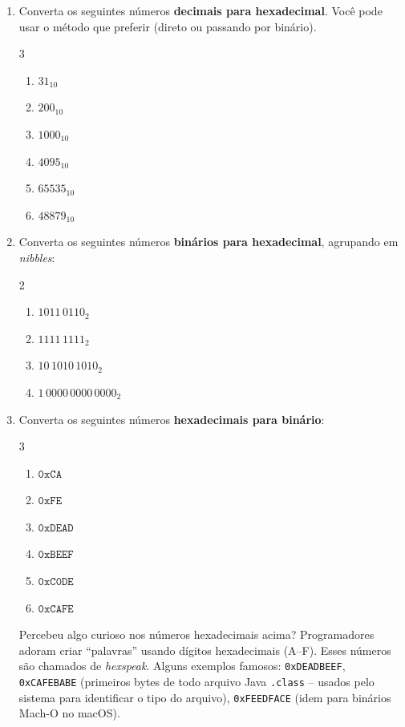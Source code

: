 \documentclass[11pt, a4paper]{article}
\begin{document}
\begin{enumerate}
\item Converta os seguintes n\'{u}meros \textbf{decimais para hexadecimal}. Voc\^{e} pode usar o m\'{e}todo que preferir (direto ou passando por bin\'{a}rio).
\begin{multicols}{3}
\begin{enumerate}
  \item $31_{10}$
  \item $200_{10}$
  \item $1000_{10}$
  \item $4095_{10}$
  \item $65535_{10}$
  \item $48879_{10}$
\end{enumerate}
\end{multicols}
\item Converta os seguintes n\'{u}meros \textbf{bin\'{a}rios para hexadecimal}, agrupando em \emph{nibbles}:
\begin{multicols}{2}
\begin{enumerate}
  \item $1011\,0110_2$
  \item $1111\,1111_2$
  \item $10\,1010\,1010_2$
  \item $1\,0000\,0000\,0000_2$
\end{enumerate}
\end{multicols}

\item Converta os seguintes n\'{u}meros \textbf{hexadecimais para bin\'{a}rio}:
\begin{multicols}{3}
\begin{enumerate}
  \item $\texttt{0xCA}$
  \item $\texttt{0xFE}$
  \item $\texttt{0xDEAD}$
  \item $\texttt{0xBEEF}$
  \item $\texttt{0xC0DE}$
  \item $\texttt{0xCAFE}$
\end{enumerate}
\end{multicols}

\begin{curiosidade}
Percebeu algo curioso nos n\'{u}meros hexadecimais acima? Programadores adoram criar ``palavras'' usando d\'{i}gitos hexadecimais (A--F). Esses n\'{u}meros s\~{a}o chamados de \emph{hexspeak}. Alguns exemplos famosos: \texttt{0xDEADBEEF}, \texttt{0xCAFEBABE} (primeiros bytes de todo arquivo Java \texttt{.class} -- usados pelo sistema para identificar o tipo do arquivo), \texttt{0xFEEDFACE} (idem para bin\'{a}rios Mach-O no macOS).
\end{curiosidade}


\end{enumerate}
\end{document}
